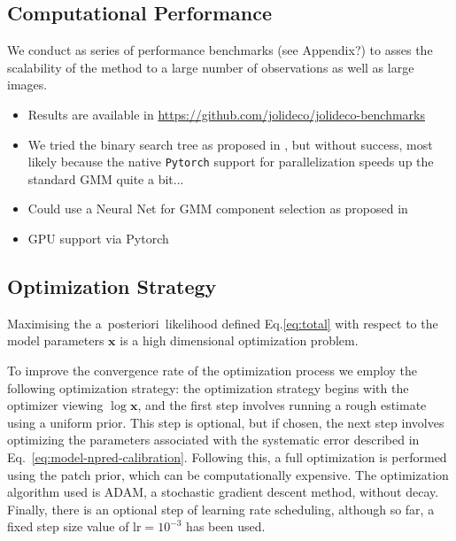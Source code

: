 \documentclass[twocolumn]{aastex631}
\newcommand{\aposteriori}{a~posteriori~}
\begin{document}
    \subsection{Computational Performance}
    We conduct as series of performance benchmarks (see Appendix?) to asses the scalability of the method to a large number of observations as well as large images. 

    \begin{itemize}
        \item Results are available in \url{https://github.com/jolideco/jolideco-benchmarks}
        \item We tried the binary search tree as proposed in \cite{Parameswaran2018},
        but without success, most likely because the native \texttt{Pytorch} support
        for parallelization speeds up the standard GMM quite a bit...
        \item Could use a Neural Net for GMM component selection as proposed in \cite{Rosenbaum15}
        \item GPU support via Pytorch
    \end{itemize}

    

    \subsection{Optimization Strategy}
    Maximising the \aposteriori likelihood defined Eq.\ref{eq:total} with respect to the model parameters $\mathbf{x}$ is a high dimensional optimization problem.
    
    To improve the convergence rate of the optimization process we employ the following optimization strategy: the optimization strategy begins with the optimizer viewing $\log{\mathbf{x}}$, and the first step involves running a rough estimate using a uniform prior. This step is optional, but if chosen, the next step involves optimizing the parameters associated with the systematic error described in Eq.~\ref{eq:model-npred-calibration}. Following this, a full optimization is performed using the patch prior, which can be computationally expensive. The optimization algorithm used is ADAM, a stochastic gradient descent method, without decay. Finally, there is an optional step of learning rate scheduling, although so far, a fixed step size value of $\mathrm{lr}=10^{-3}$ has been used.
    
\end{document}
